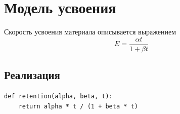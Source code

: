 \documentclass{article}
\begin{document}
\section{Модель усвоения}
Скорость усвоения материала описывается выражением
\begin{equation}
E = \frac{\alpha t}{1 + \beta t}
\end{equation}
\subsection{Реализация}
\begin{verbatim}
def retention(alpha, beta, t):
    return alpha * t / (1 + beta * t)
\end{verbatim}
\end{document}
